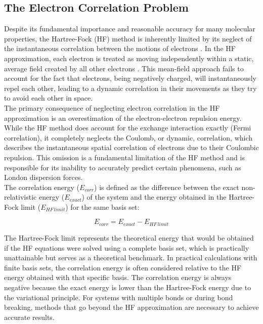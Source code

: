 \subsection{The Electron Correlation Problem}
\label{subsec:electron_correlation}
Despite its fundamental importance and reasonable accuracy for many molecular properties, the Hartree-Fock (HF) method is inherently limited by its neglect of the instantaneous correlation between the motions of electrons . In the HF approximation, each electron is treated as moving independently within a static, average field created by all other electrons . This mean-field approach fails to account for the fact that electrons, being negatively charged, will instantaneously repel each other, leading to a dynamic correlation in their movements as they try to avoid each other in space.\\
The primary consequence of neglecting electron correlation in the HF approximation is an overestimation of the electron-electron repulsion energy. While the HF method does account for the exchange interaction exactly (Fermi correlation), it completely neglects the Coulomb, or dynamic, correlation, which describes the instantaneous spatial correlation of electrons due to their Coulombic repulsion. This omission is a fundamental limitation of the HF method and is responsible for its inability to accurately predict certain phenomena, such as London dispersion forces.\\
The correlation energy ($E_{corr}$) is defined as the difference between the exact non-relativistic energy ($E_{exact}$) of the system and the energy obtained in the Hartree-Fock limit ($E_{HF\,limit}$) for the same basis set:

\begin{equation}\label{eq:Ecorr}
    E_{corr} =E_{exact}-E_{HF\,limit}
\end{equation}

The Hartree-Fock limit represents the theoretical energy that would be obtained if the HF equations were solved using a complete basis set, which is practically unattainable but serves as a theoretical benchmark. In practical calculations with finite basis sets, the correlation energy is often considered relative to the HF energy obtained with that specific basis. The correlation energy is always negative because the exact energy is lower than the Hartree-Fock energy due to the variational principle. For systems with multiple bonds or during bond breaking, methods that go beyond the HF approximation are necessary to achieve accurate results.
